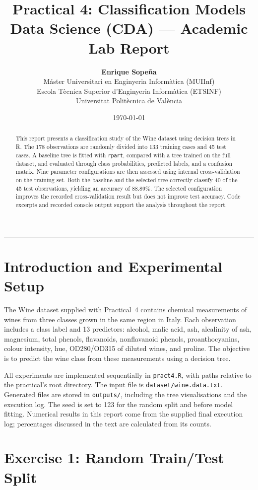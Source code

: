 \documentclass[11pt,a4paper]{article}
\title{\textbf{Practical 4: Classification Models}\\[0.4ex] \Large Data Science (CDA) --- Academic Lab Report}
\author{\textbf{Enrique Sopeña} \\ 
Máster Universitari en Enginyeria Informàtica (MUIInf) \\
Escola Tècnica Superior d'Enginyeria Informàtica (ETSINF) \\ 
Universitat Politècnica de València}
\date{\today}
\begin{document}
\maketitle

\begin{abstract}
  This report presents a classification study of the Wine dataset using decision trees in R. The 178 observations are randomly divided into 133 training cases and 45 test cases. A baseline tree is fitted with \texttt{rpart}, compared with a tree trained on the full dataset, and evaluated through class probabilities, predicted labels, and a confusion matrix. Nine parameter configurations are then assessed using internal cross-validation on the training set. Both the baseline and the selected tree correctly classify 40 of the 45 test observations, yielding an accuracy of 88.89\%. The selected configuration improves the recorded cross-validation result but does not improve test accuracy. Code excerpts and recorded console output support the analysis throughout the report.
\end{abstract}

\vspace{0.8em}
\hrule
\vspace{1em}

\section{Introduction and Experimental Setup}
The Wine dataset supplied with Practical~4 contains chemical measurements of wines from three classes grown in the same region in Italy. Each observation includes a class label and 13 predictors: alcohol, malic acid, ash, alcalinity of ash, magnesium, total phenols, flavanoids, nonflavanoid phenols, proanthocyanins, colour intensity, hue, OD280/OD315 of diluted wines, and proline. The objective is to predict the wine class from these measurements using a decision tree.

All experiments are implemented sequentially in \texttt{pract4.R}, with paths relative to the practical's root directory. The input file is \texttt{dataset/wine.data.txt}. Generated files are stored in \texttt{outputs/}, including the tree visualisations and the execution log. The seed is set to 123 for the random split and before model fitting. Numerical results in this report come from the supplied final execution log; percentages discussed in the text are calculated from its counts.

\newpage
\section{Exercise 1: Random Train/Test Split}
\end{document}
